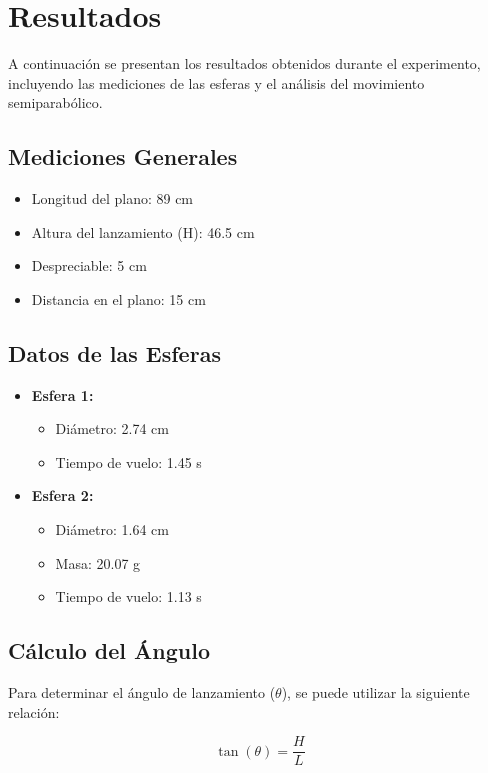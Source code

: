 \documentclass[a4paper,12pt]{article}
\begin{document}
\section{Resultados}

A continuación se presentan los resultados obtenidos durante el experimento, incluyendo las mediciones de las esferas y el análisis del movimiento semiparabólico.

\subsection{Mediciones Generales}
\begin{itemize}
    \item Longitud del plano: 89 cm
    \item Altura del lanzamiento (H): 46.5 cm
    \item Despreciable: 5 cm
    \item Distancia en el plano: 15 cm
\end{itemize}

\subsection{Datos de las Esferas}
\begin{itemize}
    \item \textbf{Esfera 1:}
    \begin{itemize}
        \item Diámetro: 2.74 cm
        \item Tiempo de vuelo: 1.45 s
    \end{itemize}

    \item \textbf{Esfera 2:}
    \begin{itemize}
        \item Diámetro: 1.64 cm
        \item Masa: 20.07 g
        \item Tiempo de vuelo: 1.13 s
    \end{itemize}
\end{itemize}

\subsection{Cálculo del Ángulo}
Para determinar el ángulo de lanzamiento (\(\theta\)), se puede utilizar la siguiente relación:

\[
\tan(\theta) = \frac{H}{L}
\]
\end{document}
